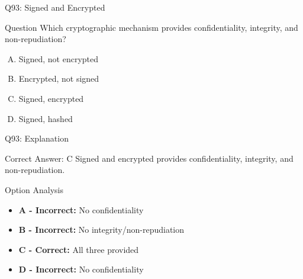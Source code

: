 \documentclass{beamer}
\begin{document}
	\begin{frame}{Q93: Signed and Encrypted}
		\begin{block}{Question}
			Which cryptographic mechanism provides confidentiality, integrity, and non-repudiation?
		\end{block}
		\begin{enumerate}[(A)]
			\item Signed, not encrypted
			\item Encrypted, not signed
			\item Signed, encrypted
			\item Signed, hashed
		\end{enumerate}
	\end{frame}
	
	\begin{frame}{Q93: Explanation}
		\begin{block}{Correct Answer: C}
			Signed and encrypted provides confidentiality, integrity, and non-repudiation.
		\end{block}
		\begin{block}{Option Analysis}
			\begin{itemize}
				\item \textbf{A - Incorrect:} No confidentiality
				\item \textbf{B - Incorrect:} No integrity/non-repudiation
				\item \textbf{C - Correct:} All three provided
				\item \textbf{D - Incorrect:} No confidentiality
			\end{itemize}
		\end{block}
	\end{frame}
	
\end{document}
